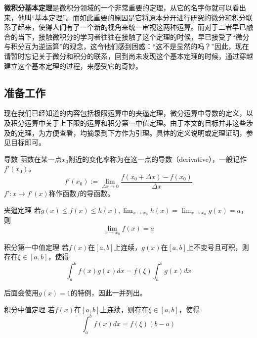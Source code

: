 
\begin{issues}
\issueTODO
\issueMissDepend
\issueNeedCite
\end{issues}


\textbf{微积分基本定理}是微积分领域的一个非常重要的定理，从它的名字你就可以看出来，他叫“基本定理”。而如此重要的原因是它将原本分开进行研究的微分和积分联系了起来，使得人们有了一个新的视角来统一审视这两种运算。而对于二者早已融合的当下，接触微积分的学习者往往在接触了这个定理的时候，早已接受了“微分与积分互为逆运算”的观念，这令他们感到困惑：“这不是显然的吗？”因此，现在请暂时忘记关于微分和积分的联系，回到尚未发现这个基本定理的时候，通过穿越建立这个基本定理的过程，来感受它的奇妙。

\subsection{准备工作}

现在我们已经知道的内容包括极限运算中的夹逼定理，微分运算中导数的定义，以及积分运算中关于上下限的运算和积分第一中值定理。由于本文的目标并非这些涉及的定理，为方便查看，均摘录到下方作为引理。具体的定义说明或定理证明，参见目标即可。

\begin{definition}{导数}
函数在某一点$x_0$附近的变化率称为在这一点的导数（derivative），一般记作$f'(x_0)$。
$$f'(x_0):=\lim_{\Delta x\to0}{\frac{f(x_0+\Delta x)-f(x_0)}{\Delta x}}$$
$f':x\mapsto f'(x)$称作函数$f$的导函数。
\end{definition}

\begin{lemma}{夹逼定理}
若$g(x)\leq f(x)\leq h(x),\lim _{x\to x_0}h(x)=\lim _{x\to x_0}g(x)=a$，则
$$\lim _{x\to x_0}f(x)=a$$
\end{lemma}

\begin{lemma}{积分第一中值定理}
若$f(x)$在$[a,b]$上连续，$g(x)$在$[a,b]$上不变号且可积，则存在$\xi\in[a,b]$，使得
$$\int_{a}^{b} f(x)g(x)dx=f(\xi)\int_{a}^{b} g(x)dx$$
\end{lemma}

后面会使用$g(x)=1$的特例，因此一并列出。

\begin{lemma}{积分中值定理}
若$f(x)$在$[a,b]$上连续，则存在$\xi\in[a,b]$，使得
$$\int_{a}^{b} f(x)dx=f(\xi)(b-a)$$
\end{lemma}
